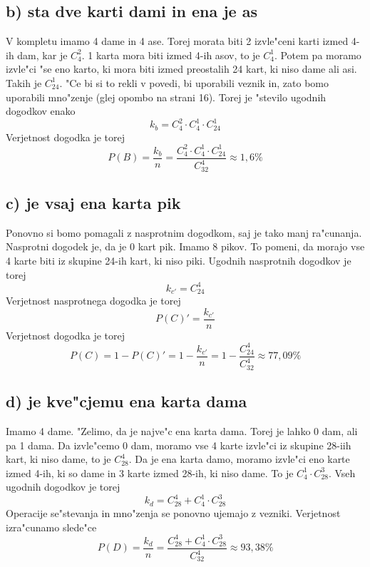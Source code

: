 \documentclass[a4paper, 12pt]{article}
\begin{document}
\subsection*{b) sta dve karti dami in ena je as}
V kompletu imamo 4 dame in 4 ase. Torej morata biti 2 izvle"ceni karti izmed 4-ih dam, kar je $C_4^2$. 1 karta mora biti izmed 4-ih asov, to je $C_4^1$. Potem pa moramo izvle"ci "se eno karto, ki mora biti izmed preostalih 24 kart, ki niso dame ali asi. Takih je $C_{24}^1$. "Ce bi si to rekli v povedi, bi uporabili veznik in, zato bomo uporabili mno"zenje (glej opombo na strani 16). Torej je "stevilo ugodnih dogodkov enako
\begin{equation*}
k_b = C_4^2 \cdot C_4^1 \cdot C_{24}^1
\end{equation*}
Verjetnost dogodka je torej
\begin{equation*}
P(B) = \dfrac{k_b}{n} = \dfrac{C_4^2 \cdot C_4^1 \cdot C_{24}^1}{C_{32}^4} \approx 1,6\%
\end{equation*}

\subsection*{c) je vsaj ena karta pik}
Ponovno si bomo pomagali z nasprotnim dogodkom, saj je tako manj ra"cunanja. Nasprotni dogodek je, da je 0 kart pik. Imamo 8 pikov. To pomeni, da morajo vse 4 karte biti iz skupine 24-ih kart, ki niso piki. Ugodnih nasprotnih dogodkov je torej
\begin{equation*}
k_{c'} = C_{24}^4
\end{equation*}
Verjetnost nasprotnega dogodka je torej
\begin{equation*}
P(C)' = \dfrac{k_{c'}}{n}
\end{equation*}
Verjetnost dogodka je torej
\begin{equation*}
P(C) = 1 - P(C)' = 1 - \dfrac{k_{c'}}{n} = 1 - \dfrac{C_{24}^4}{C_{32}^4} \approx 77,09\%
\end{equation*}

\subsection*{d) je kve"cjemu ena karta dama}
Imamo 4 dame. "Zelimo, da je najve"c ena karta dama. Torej je lahko 0 dam, ali pa 1 dama. Da izvle"cemo 0 dam, moramo vse 4 karte izvle"ci iz skupine 28-iih kart, ki niso dame, to je $C_{28}^4$. Da je ena karta damo, moramo izvle"ci eno karte izmed 4-ih, ki so dame in 3 karte izmed 28-ih, ki niso dame. To je $C_4^1 \cdot C_{28}^3$. Vseh ugodnih dogodkov je torej
\begin{equation*}
k_d = C_{28}^4 + C_4^1 \cdot C_{28}^3
\end{equation*}
Operacije se"stevanja in mno"zenja se ponovno ujemajo z vezniki. Verjetnost izra"cunamo slede"ce
\begin{equation*}
P(D) = \dfrac{k_d}{n} = \dfrac{C_{28}^4 + C_4^1 \cdot C_{28}^3}{C_{32}^4} \approx 93,38\%
\end{equation*}
\end{document}
